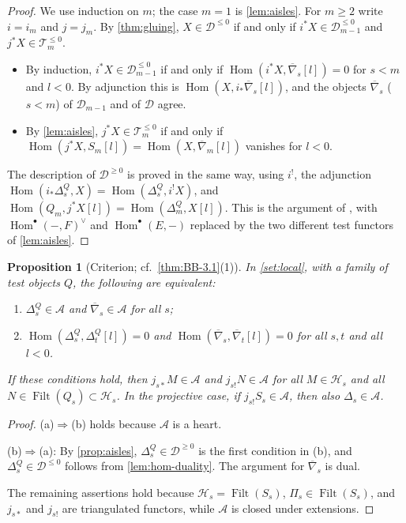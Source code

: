 \documentclass[11pt,reqno]{amsart}
\theoremstyle{plain}
\newtheorem{proposition}[theorem]{Proposition}
\theoremstyle{definition}
\theoremstyle{remark}
\DeclareMathOperator{\Hom}{Hom}
\DeclareMathOperator{\Filt}{Filt}
\newcommand{\nablabar}{\overline{\nabla}}
\newcommand{\cD}{\mathcal{D}}
\newcommand{\cA}{\mathcal{A}}
\newcommand{\cH}{\mathcal{H}}
\newcommand{\cT}{\mathcal{T}}
\begin{document}
\begin{proof}
We use induction on $m$; the case $m=1$ is \cref{lem:aisles}. For $m\ge2$ write $i=i_m$ and $j=j_m$. By \cref{thm:gluing}, $X\in\cD^{\le0}$ if and only if $i^*X\in\cD_{m-1}^{\le0}$ and $j^*X\in\cT_m^{\le0}$.
\begin{itemize}
\item By induction, $i^*X\in\cD_{m-1}^{\le0}$ if and only if $\Hom(i^*X,\nablabar_s[l])=0$ for $s<m$ and $l<0$. By adjunction this is $\Hom(X,i_*\nablabar_s[l])$, and the objects $\nablabar_s$ ($s<m$) of $\cD_{m-1}$ and of $\cD$ agree.
\item By \cref{lem:aisles}, $j^*X\in\cT_m^{\le0}$ if and only if $\Hom(j^*X,S_m[l])=\Hom(X,\nablabar_m[l])$ vanishes for $l<0$.
\end{itemize}
The description of $\cD^{\ge0}$ is proved in the same way, using $i^!$, the adjunction $\Hom(i_*\Delta^Q_s,X)=\Hom(\Delta^Q_s,i^!X)$, and $\Hom(Q_m,j^*X[l])=\Hom(\Delta^Q_m,X[l])$. This is the argument of \cite[Lemma~2.4]{BB26}, with $\Hom^\bullet(-,F)^\vee$ and $\Hom^\bullet(E,-)$ replaced by the two different test functors of \cref{lem:aisles}.
\end{proof}

\begin{proposition}[Criterion; cf.\ {\cref{thm:BB-3.1}(1)}]\label{prop:criterion}
In \cref{set:local}, with a family of test objects $Q$, the following are equivalent:
\begin{enumerate}
\item[(a)] $\Delta^Q_s\in\cA$ and $\nablabar_s\in\cA$ for all $s$;
\item[(b)] $\Hom(\Delta^Q_s,\Delta^Q_t[l])=0$ and $\Hom(\nablabar_s,\nablabar_t[l])=0$ for all $s,t$ and all $l<0$.
\end{enumerate}
If these conditions hold, then $j_{s*}M\in\cA$ and $j_{s!}N\in\cA$ for all $M\in\cH_s$ and all $N\in\Filt(Q_s)\subset\cH_s$. In the projective case, if $j_{s!}S_s\in\cA$, then also $\Delta_s\in\cA$.
\end{proposition}

\begin{proof}
(a)$\Rightarrow$(b) holds because $\cA$ is a heart.

(b)$\Rightarrow$(a): By \cref{prop:aisles}, $\Delta^Q_s\in\cD^{\ge0}$ is the first condition in (b), and $\Delta^Q_s\in\cD^{\le0}$ follows from \cref{lem:hom-duality}. The argument for $\nablabar_s$ is dual.

The remaining assertions hold because $\cH_s=\Filt(S_s)$, $\Pi_s\in\Filt(S_s)$, and $j_{s*}$ and $j_{s!}$ are triangulated functors, while $\cA$ is closed under extensions.
\end{proof}
\end{document}
